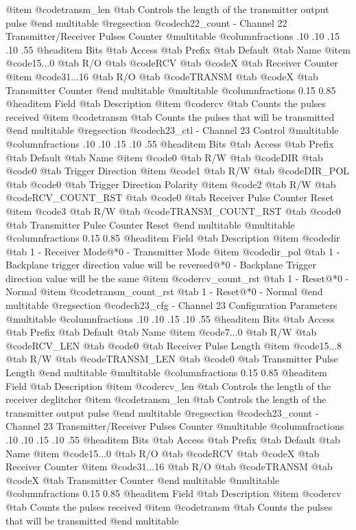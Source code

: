 @item @code{transm_len} @tab Controls the length of the transmitter output pulse
@end multitable
@regsection @code{ch22_count} - Channel 22 Transmitter/Receiver Pulses Counter
@multitable @columnfractions .10 .10 .15 .10 .55
@headitem Bits @tab Access @tab Prefix @tab Default @tab Name
@item @code{15...0}
@tab R/O @tab
@code{RCV}
@tab @code{X} @tab 
Receiver Counter
@item @code{31...16}
@tab R/O @tab
@code{TRANSM}
@tab @code{X} @tab 
Transmitter Counter
@end multitable
@multitable @columnfractions 0.15 0.85
@headitem Field @tab Description
@item @code{rcv} @tab Counts the pulses received
@item @code{transm} @tab Counts the pulses that will be transmitted
@end multitable
@regsection @code{ch23_ctl} - Channel 23 Control
@multitable @columnfractions .10 .10 .15 .10 .55
@headitem Bits @tab Access @tab Prefix @tab Default @tab Name
@item @code{0}
@tab R/W @tab
@code{DIR}
@tab @code{0} @tab 
Trigger Direction
@item @code{1}
@tab R/W @tab
@code{DIR_POL}
@tab @code{0} @tab 
Trigger Direction Polarity
@item @code{2}
@tab R/W @tab
@code{RCV_COUNT_RST}
@tab @code{0} @tab 
Receiver Pulse Counter Reset
@item @code{3}
@tab R/W @tab
@code{TRANSM_COUNT_RST}
@tab @code{0} @tab 
Transmitter Pulse Counter Reset
@end multitable
@multitable @columnfractions 0.15 0.85
@headitem Field @tab Description
@item @code{dir} @tab 1 - Receiver Mode@*0 - Transmitter Mode
@item @code{dir_pol} @tab 1 - Backplane trigger direction value will be reversed@*0 - Backplane Trigger direction value will be the same
@item @code{rcv_count_rst} @tab 1 - Reset@*0 - Normal
@item @code{transm_count_rst} @tab 1 - Reset@*0 - Normal
@end multitable
@regsection @code{ch23_cfg} - Channel 23 Configuration Parameters
@multitable @columnfractions .10 .10 .15 .10 .55
@headitem Bits @tab Access @tab Prefix @tab Default @tab Name
@item @code{7...0}
@tab R/W @tab
@code{RCV_LEN}
@tab @code{0} @tab 
Receiver Pulse Length
@item @code{15...8}
@tab R/W @tab
@code{TRANSM_LEN}
@tab @code{0} @tab 
Transmitter Pulse Length
@end multitable
@multitable @columnfractions 0.15 0.85
@headitem Field @tab Description
@item @code{rcv_len} @tab Controls the length of the receiver deglitcher
@item @code{transm_len} @tab Controls the length of the transmitter output pulse
@end multitable
@regsection @code{ch23_count} - Channel 23 Transmitter/Receiver Pulses Counter
@multitable @columnfractions .10 .10 .15 .10 .55
@headitem Bits @tab Access @tab Prefix @tab Default @tab Name
@item @code{15...0}
@tab R/O @tab
@code{RCV}
@tab @code{X} @tab 
Receiver Counter
@item @code{31...16}
@tab R/O @tab
@code{TRANSM}
@tab @code{X} @tab 
Transmitter Counter
@end multitable
@multitable @columnfractions 0.15 0.85
@headitem Field @tab Description
@item @code{rcv} @tab Counts the pulses received
@item @code{transm} @tab Counts the pulses that will be transmitted
@end multitable

